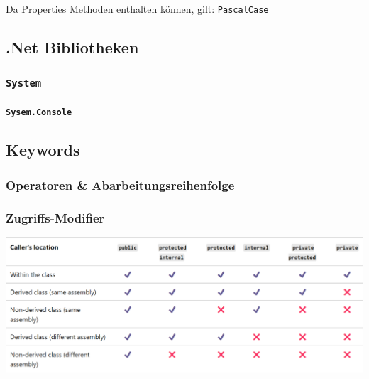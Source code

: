 \documentclass[
  9pt,
  a4paperpaper,
  DIV=11]{scrartcl}
\let\oldparagraph\paragraph
\renewcommand{\paragraph}[1]{\oldparagraph{#1}\mbox{}}
\numberwithin{equation}{section}
\begin{document}
\begin{multicols}{2}
\begin{tcolorbox}
\begin{tcolorbox}
\begin{tcolorbox}
\begin{tcolorbox}[enhanced jigsaw, colbacktitle=quarto-callout-important-color!10!white, colback=white, rightrule=.15mm, title=\textcolor{quarto-callout-important-color}{\faExclamation}\hspace{0.5em}{Namensgebung}, opacityback=0, arc=.35mm, coltitle=black, opacitybacktitle=0.6, breakable, bottomtitle=1mm, toptitle=1mm, colframe=quarto-callout-important-color-frame, bottomrule=.15mm, titlerule=0mm, left=2mm, leftrule=.75mm, toprule=.15mm]

Da Properties Methoden enthalten können, gilt: \texttt{PascalCase}

\end{tcolorbox}

\hypertarget{net-bibliotheken}{%
\subsection{.Net Bibliotheken}\label{net-bibliotheken}}

\hypertarget{system}{%
\subsubsection{\texorpdfstring{\texttt{System}}{System}}\label{system}}

\hypertarget{sysem.console}{%
\paragraph{\texorpdfstring{\texttt{Sysem.Console}}{Sysem.Console}}\label{sysem.console}}

\hypertarget{keywords}{%
\subsection{Keywords}\label{keywords}}

\hypertarget{operatoren-abarbeitungsreihenfolge}{%
\subsubsection{Operatoren \&
Abarbeitungsreihenfolge}\label{operatoren-abarbeitungsreihenfolge}}

\hypertarget{sec-modifier}{%
\subsubsection{Zugriffs-Modifier}\label{sec-modifier}}

\includegraphics{images/AccessModifiers.png}


\end{tcolorbox}
\end{tcolorbox}
\end{tcolorbox}
\end{multicols}
\end{document}
